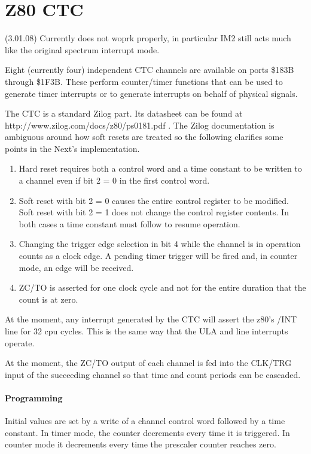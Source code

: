 \section{Z80 CTC}
(3.01.08) Currently does not woprk properly, in particular IM2 still
acts much like the original spectrum interrupt mode.

Eight (currently four) independent CTC channels are available on ports
\$183B through \$1F3B.  These perform counter/timer functions that can
be used to generate timer interrupts or to generate interrupts on
behalf of physical signals.

The CTC is a standard Zilog part.  Its datasheet can be found at
http://www.zilog.com/docs/z80/ps0181.pdf .  The Zilog documentation is
ambiguous around how soft resets are treated so the following
clarifies some points in the Next's implementation.

\begin{enumerate}
\item Hard reset requires both a control word and a time constant to
  be written to a channel even if bit 2 = 0 in the first control word.
\item Soft reset with bit 2 = 0 causes the entire control register to
  be modified.  Soft reset with bit 2 = 1 does not change the control
  register contents.  In both cases a time constant must follow to
  resume operation.
\item Changing the trigger edge selection in bit 4 while the channel
  is in operation counts as a clock edge.  A pending timer trigger
  will be fired and, in counter mode, an edge will be received.
\item ZC/TO is asserted for one clock cycle and not for the entire
  duration that the count is at zero.
\end{enumerate}
At the moment, any interrupt generated by the CTC will assert the
z80's /INT line for 32 cpu cycles.  This is the same way that the ULA
and line interrupts operate.

At the moment, the ZC/TO output of each channel is fed into the
CLK/TRG input of the succeeding channel so that time and count periods
can be cascaded.

\paragraph{Programming}
Initial values are set by a write of a channel control word followed
by a time constant. In timer mode, the counter decrements every time
it is triggered. In counter mode it decrements every time the
prescaler counter reaches zero.

